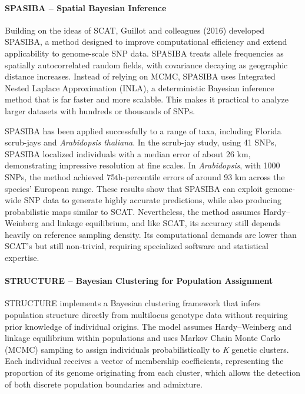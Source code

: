 \documentclass[twocolumn,10pt]{article}
\begin{document}
\paragraph{SPASIBA – Spatial Bayesian Inference}

Building on the ideas of SCAT, Guillot and colleagues (2016) \citep{guillot2016accurate} developed
SPASIBA, a method designed to improve computational efficiency and extend applicability to
genome-scale SNP data. SPASIBA treats allele frequencies as spatially autocorrelated random fields,
with covariance decaying as geographic distance increases. Instead of relying on MCMC, SPASIBA uses
Integrated Nested Laplace Approximation (INLA), a deterministic Bayesian inference method that is
far faster and more scalable. This makes it practical to analyze larger datasets with hundreds or
thousands of SNPs.

SPASIBA has been applied successfully to a range of taxa, including Florida scrub-jays and
\textit{Arabidopsis thaliana}. In the scrub-jay study, using 41 SNPs, SPASIBA localized individuals
with a median error of about 26 km, demonstrating impressive resolution at fine scales. In
\textit{Arabidopsis}, with 1000 SNPs, the method achieved 75th-percentile errors of around 93 km
across the species' European range. These results show that SPASIBA can exploit genome-wide SNP data
to generate highly accurate predictions, while also producing probabilistic maps similar to SCAT.
Nevertheless, the method assumes Hardy–Weinberg and linkage equilibrium, and like SCAT, its accuracy
still depends heavily on reference sampling density. Its computational demands are lower than SCAT's
but still non-trivial, requiring specialized software and statistical expertise.

\paragraph{STRUCTURE – Bayesian Clustering for Population Assignment}

STRUCTURE \citep{pritchard2000inference} implements a Bayesian clustering framework that infers
population structure directly from multilocus genotype data without requiring prior knowledge of
individual origins. The model assumes Hardy–Weinberg and linkage equilibrium within populations and
uses Markov Chain Monte Carlo (MCMC) sampling to assign individuals probabilistically to \textit{K}
genetic clusters. Each individual receives a vector of membership coefficients, representing the
proportion of its genome originating from each cluster, which allows the detection of both discrete
population boundaries and admixture.
\end{document}

